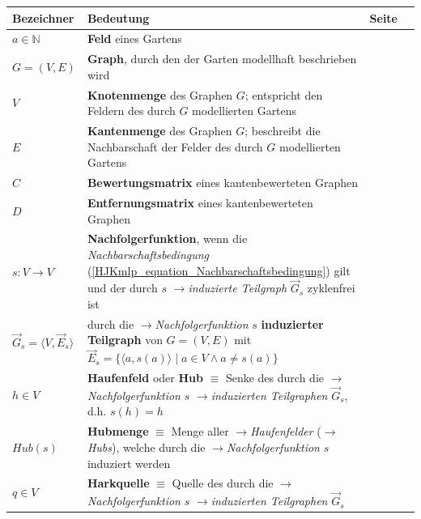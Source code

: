 \begin{tabular}{lp{12cm}cm{1cm}}
\textbf{Bezeichner} & \textbf{Bedeutung} & \textbf{Seite}\\
\hline
$a \in \mathbb{N}$ 
& \textbf{Feld} eines Gartens
& \pageref{Felder}\\

$G=(V,E)$
& \textbf{Graph}, durch den der Garten modellhaft beschrieben wird
& \pageref{Graph}\\

$V$
& \textbf{Knotenmenge} des Graphen $G$; entspricht den Feldern des durch $G$ modellierten Gartens
& \pageref{Knotenmenge}\\

$E$
& \textbf{Kantenmenge} des Graphen $G$; beschreibt die Nachbarschaft der Felder des durch $G$ modellierten Gartens
& \pageref{Kantenmenge}\\

$C$
& \textbf{Bewertungsmatrix} eines kantenbewerteten Graphen
& \pageref{Bewertungsmatrix}\\

$D$
& \textbf{Entfernungsmatrix} eines kantenbewerteten Graphen
& \pageref{Entfernungsmatrix}\\

$s: V \rightarrow V$ 
& \textbf{Nachfolgerfunktion}, wenn die \textit{Nachbarschaftsbedingung} (\ref{HJKmlp_equation_Nachbarschaftsbedingung}) gilt und der durch $s$ $\rightarrow$\textit{induzierte Teilgraph} $\vec{G}_s$ zyklenfrei ist
& \pageref{Nachfolgerfunktion}\\

$\vec{G}_s = \langle V,\vec{E}_s \rangle$
& durch die $\rightarrow$\textit{Nachfolgerfunktion} $s$ \textbf{induzierter Teilgraph} von $G=(V,E)$ mit $\vec{E}_s = \{\langle a,s(a)\rangle \mid a\in V \wedge a \neq s(a)\}$
& \pageref{induzierter Teilgraph}\\

$h \in V$
& \textbf{Haufenfeld} oder \textbf{Hub} $\equiv$ Senke des durch die $\rightarrow$\textit{Nachfolgerfunktion} $s$ $\rightarrow$\textit{induzierten Teilgraphen} $\vec{G}_s$, d.h. $s(h)=h$
& \pageref{Hub}\\

$Hub(s)$
& \textbf{Hubmenge} $\equiv$ Menge aller $\rightarrow$\textit{Haufenfelder} ($\rightarrow$\textit{Hubs}), welche durch die $\rightarrow$\textit{Nachfolgerfunktion} $s$ induziert werden 
& \pageref{Hubmenge}\\

$q \in V$
& \textbf{Harkquelle} $\equiv$ Quelle des durch die $\rightarrow$\textit{Nachfolgerfunktion} $s$ $\rightarrow$\textit{induzierten Teilgraphen} $\vec{G}_s$
& \pageref{Harkquelle}\\


\end{tabular}
